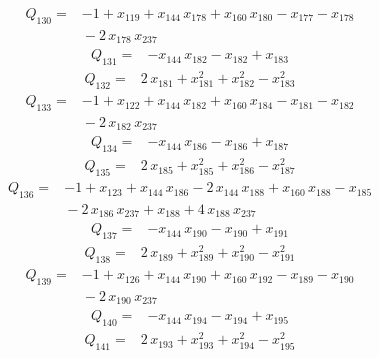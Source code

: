 \documentclass[11pt]{article}
\theoremstyle{definition}\newtheorem{definition}[theorem]{Definition}
\begin{document}
\begin{align*}
Q_{130}={}&-1+x_{119}+x_{144}\,x_{178}+x_{160}\,x_{180}-x_{177}-x_{178}
\\ &{}-2\,x_{178}\,x_{237}
\end{align*}
\begin{align*}
Q_{131}={}&-x_{144}\,x_{182}-x_{182}+x_{183}
\end{align*}
\begin{align*}
Q_{132}={}&2\,x_{181}+x_{181}^{2}+x_{182}^{2}-x_{183}^{2}
\end{align*}
\begin{align*}
Q_{133}={}&-1+x_{122}+x_{144}\,x_{182}+x_{160}\,x_{184}-x_{181}-x_{182}
\\ &{}-2\,x_{182}\,x_{237}
\end{align*}
\begin{align*}
Q_{134}={}&-x_{144}\,x_{186}-x_{186}+x_{187}
\end{align*}
\begin{align*}
Q_{135}={}&2\,x_{185}+x_{185}^{2}+x_{186}^{2}-x_{187}^{2}
\end{align*}
\begin{align*}
Q_{136}={}&-1+x_{123}+x_{144}\,x_{186}-2\,x_{144}\,x_{188}+x_{160}\,x_{188}-x_{185}
\\ &{}-2\,x_{186}\,x_{237}+x_{188}+4\,x_{188}\,x_{237}
\end{align*}
\begin{align*}
Q_{137}={}&-x_{144}\,x_{190}-x_{190}+x_{191}
\end{align*}
\begin{align*}
Q_{138}={}&2\,x_{189}+x_{189}^{2}+x_{190}^{2}-x_{191}^{2}
\end{align*}
\begin{align*}
Q_{139}={}&-1+x_{126}+x_{144}\,x_{190}+x_{160}\,x_{192}-x_{189}-x_{190}
\\ &{}-2\,x_{190}\,x_{237}
\end{align*}
\begin{align*}
Q_{140}={}&-x_{144}\,x_{194}-x_{194}+x_{195}
\end{align*}
\begin{align*}
Q_{141}={}&2\,x_{193}+x_{193}^{2}+x_{194}^{2}-x_{195}^{2}
\end{align*}
\end{document}
